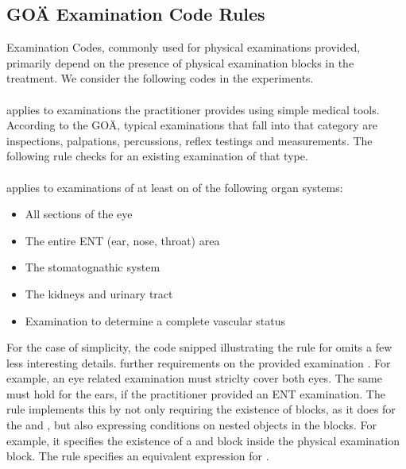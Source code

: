 \subsection{GOÄ Examination Code Rules}\label{subsec:examination-code-rules}
Examination Codes, commonly used for physical examinations provided, primarily depend on the presence of physical examination blocks in the treatment.
We consider the following codes in the experiments.

\paragraph{}
 applies to examinations the practitioner provides using simple medical tools.
According to the GOÄ, typical examinations that fall into that category are inspections, palpations, percussions, reflex testings and measurements.
The following rule checks for an existing examination of that type.


\paragraph{}
 applies to examinations of at least on of the following organ systems:
\begin{itemize}
    \item All sections of the eye
    \item The entire ENT (ear, nose, throat) area
    \item The stomatognathic system
    \item The kidneys and urinary tract
    \item Examination to determine a complete vascular status
\end{itemize}
For the case of simplicity, the code snipped illustrating the rule for  omits a few less interesting details.
 further requirements on the provided examination \cite{bruck1998kommentar}.
For example, an eye related examination must striclty cover both eyes.
The same must hold for the ears, if the practitioner provided an ENT examination.
The rule implements this by not only requiring the existence of blocks, as it does for the  and ,
but also expressing conditions on nested objects in the blocks.
For example, it specifies the existence of a  and  block inside the  physical examination block.
The rule specifies an equivalent expression for .

